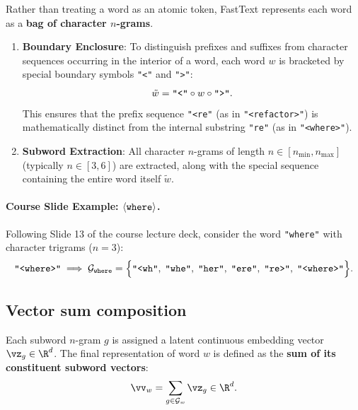 \documentclass[../../main.tex]{subfiles}
\begin{document}
Rather than treating a word as an atomic token, FastText represents each word as a \textbf{bag of character $n$-grams}.

\begin{enumerate}
    \item \textbf{Boundary Enclosure}: To distinguish prefixes and suffixes from character sequences occurring in the interior of a word, each word $w$ is bracketed by special boundary symbols \texttt{"<"} and \texttt{">"}:
    \begin{equation}
    \label{eq:boundary_enclosure}
    \tilde{w} = \text{\texttt{"<"}} \circ w \circ \text{\texttt{">"}}.
    \end{equation}
    This ensures that the prefix sequence \texttt{"<re"} (as in \texttt{"<refactor>"}) is mathematically distinct from the internal substring \texttt{"re"} (as in \texttt{"<where>"}).
    
    \item \textbf{Subword Extraction}: All character $n$-grams of length $n \in [n_{\min}, n_{\max}]$ (typically $n \in [3, 6]$) are extracted, along with the special sequence containing the entire word itself $\tilde{w}$.
\end{enumerate}

\paragraph{Course Slide Example: $\langle\text{\texttt{where}}\rangle$.}
Following Slide 13 of the course lecture deck, consider the word \texttt{"where"} with character trigrams ($n = 3$):
\begin{equation}
\label{eq:fasttext_subwords}
\text{\texttt{"<where>"}} \implies \mathcal{G}_{\text{\texttt{where}}} = \Big\{ \text{\texttt{"<wh"}}, \; \text{\texttt{"whe"}}, \; \text{\texttt{"her"}}, \; \text{\texttt{"ere"}}, \; \text{\texttt{"re>"}}, \; \text{\texttt{"<where>"}} \Big\}.
\end{equation}

\subsection{Vector sum composition}
\label{subsec:fasttext_composition}

Each subword $n$-gram $g$ is assigned a latent continuous embedding vector $\vz_g \in \R^d$. The final representation of word $w$ is defined as the \textbf{sum of its constituent subword vectors}:
\begin{equation}
\label{eq:fasttext_sum}
\vv_w = \sum_{g \in \mathcal{G}_w} \vz_g \in \R^d.
\end{equation}
\end{document}
